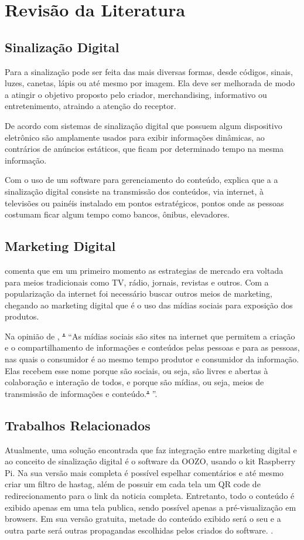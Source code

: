 \documentclass[
	12pt,				%
	openright,			%
	oneside,			%
	a4paper,			%
	english,			%
	french,				%
	spanish,			%
	brazil,				%
	]{abntex2}
\newcommand{\daniel}[2]{\sout{#1} {\color{red} #2}}
\begin{document}
\section*{Revisão da Literatura}
	

	\subsection*{Sinalização Digital}
	Para \cite{munari2006} a sinalização pode ser feita das mais diversas formas, desde códigos, sinais, luzes, canetas, lápis ou até mesmo por imagem. Ela deve ser melhorada de modo a  atingir o objetivo proposto pelo criador, merchandising, informativo ou entretenimento, atraindo a atenção do receptor. 
	
	De acordo com \cite{mishima2016} sistemas de sinalização digital que possuem algum dispositivo eletrônico são amplamente usados para exibir informações dinâmicas, ao contrários de anúncios estáticos, que ficam por determinado tempo na mesma informação. 
	
	Com o uso de um software para gerenciamento do conteúdo, \cite{machado2010} explica que a a sinalização digital consiste na transmissão dos conteúdos, via internet, à televisões ou painéis instalado em pontos estratégicos, pontos onde as pessoas costumam ficar algum tempo como bancos, ônibus, elevadores.
	
	\subsection*{Marketing Digital}
	\cite{santos2014} comenta que em um primeiro momento as estrategias de mercado era voltada para meios tradicionais como TV, rádio, jornais, revistas e outros. Com a popularização da internet foi necessário buscar outros meios de marketing, chegando ao marketing digital que é o uso das mídias sociais para exposição dos produtos.
	
	Na opinião de \cite{torres2000}, \daniel{"}{``}As mídias sociais são sites na internet que permitem a criação e o compartilhamento de informações e conteúdos pelas pessoas e para as pessoas, nas quais o consumidor é ao mesmo tempo produtor e consumidor da informação. Elas recebem esse nome porque são sociais, ou seja, são livres e abertas à colaboração e interação de todos, e porque são mídias, ou seja, meios de transmissão de informações e conteúdo.\daniel{"}{''}. 
	
	\subsection*{Trabalhos Relacionados}
	Atualmente, uma solução encontrada que faz integração entre marketing digital e ao conceito de sinalização digital é o software da OOZO, usando o kit Raspberry Pi. Na sua versão mais completa é possível espelhar comentários e até mesmo criar um filtro de hastag, além de possuir em cada tela um QR code de redirecionamento para o link da noticia completa. Entretanto, todo o conteúdo é exibido apenas em uma tela publica, sendo possível apenas a pré-visualização em browsers. Em sua versão gratuita, metade do conteúdo exibido será o seu e a outra parte será outras propagandas escolhidas pelos criados do software. \cite{oozo2017}.
	
\end{document}
